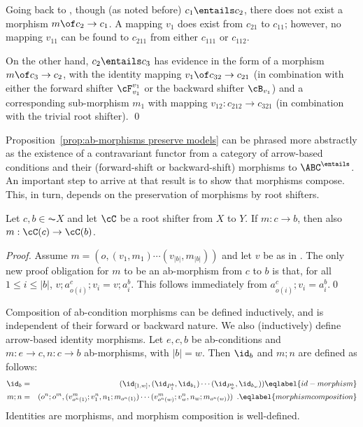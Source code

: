 \begin{example}
Going back to , though (as noted before) $c_1\entails c_2$, there does not exist a morphism $m\of c_2\to c_1$. A mapping $v_1$ does exist from $c_{21}$ to $c_{11}$; however, no mapping $v_{11}$ can be found to $c_{211}$ from either $c_{111}$ or $c_{112}$. 

On the other hand, $c_2\entails c_3$ has evidence in the form of a morphism $m\of c_3\to c_2$, with the identity mapping $v_1\of c_{32} \to c_{21}$ (in combination with either the forward shifter $\cF_{v_1}^{v_1}$ or the backward shifter $\cB_{v_1}$) and a corresponding sub-morphism $m_1$ with mapping $v_{12}:c_{212}\to c_{321}$ (in combination with the trivial root shifter).
\qed
\end{example}
%
Proposition~\ref{prop:ab-morphisms preserve models} can be phrased more abstractly as the existence of a contravariant functor from a category of arrow-based conditions and their (forward-shift or backward-shift) morphisms to $\ABC^{\entails}$. An important step to arrive at that result is to show that morphisms compose. This, in turn, depends on the preservation of morphisms by root shifters.

\begin{lemma}
Let $c,b \in  \AC{X}$ and let $\cC$ be a root shifter from $X$ to $Y$. If $m:c\to b$, then also $m:\cC(c)\to\cC(b)$. 
\end{lemma}
%
\begin{fullorname}
\begin{proof}
Assume $m = (o,(v_1,m_1)\cdots(v_{|b|},m_{|b|}))$ and let $v$ be as in . The only new proof obligation for $m$ to be an ab-morphism from $c$ to $b$ is that, for all $1\leq i\leq |b|$, $v;a^c_{o(i)};v_i=v;a^b_i$. This follows immediately from $a^c_{o(i)};v_i=a^b_i$.\qed
\end{proof}
\end{fullorname}
%
Composition of ab-condition morphisms can be defined inductively, and is independent of their forward or backward nature. We also (inductively) define arrow-based identity morphisms. Let $e,c,b$ be ab-conditions and $m:e\to c,n:c\to b$ ab-morphisms, with $|b|=w$. Then $\id_b$ and $m;n$ are defined as follows: 
%
\begin{eqnarray}
\id_b & =
  & (\id_{[1,w]},(\id_{P^b_1},\id_{b_1})\cdots 
                 (\id_{P^b_w},\id_{b_w}))
  \eqlabel{id-morphism} \\
m;n & =
  & (o^n;o^m,(v^m_{o^n(1)};v^n_1,n_1;m_{o^n(1)})\cdots 
              (v^m_{o^n(w)};v^n_w,n_w;m_{o^n(w)})) \enspace.
 \eqlabel{morphism composition}
\end{eqnarray}
%
Identities are morphisms, and morphism composition is well-defined.


